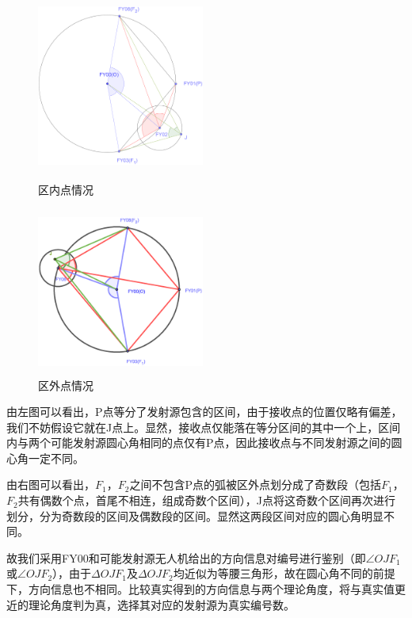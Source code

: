 \documentclass{ctexart}
\begin{document}
\begin{figure}[H]
  \begin{minipage}[t]{0.45\linewidth}
  \centering
  \includegraphics[height=5.5cm,width=5.5cm]{pic/error_circle1(1).eps}
  \caption{区内点情况}
  \label{区内点情况}
  \end{minipage}%
  \begin{minipage}[t]{0.45\linewidth}
  \centering
  \includegraphics[height=5.5cm,width=5.5cm]{pic/error_circle2.eps}
  \caption{区外点情况}
  \label{区外点情况}
  \end{minipage}
  \end{figure}


由左图可以看出，P点等分了发射源包含的区间，由于接收点的位置仅略有偏差，我们不妨假设它就在J点上。显然，接收点仅能落在等分区间的其中一个上，区间内与两个可能发射源圆心角相同的点仅有P点，因此接收点与不同发射源之间的圆心角一定不同。

由右图可以看出，$F_1$，$F_2$之间不包含P点的弧被区外点划分成了奇数段（包括$F_1$，$F_2$共有偶数个点，首尾不相连，组成奇数个区间），J点将这奇数个区间再次进行划分，分为奇数段的区间及偶数段的区间。显然这两段区间对应的圆心角明显不同。

故我们采用FY00和可能发射源无人机给出的方向信息对编号进行鉴别（即$\angle OJF_1$或$\angle OJF_2$），由于$\Delta OJF_1$及$\Delta OJF_2$均近似为等腰三角形，故在圆心角不同的前提下，方向信息也不相同。比较真实得到的方向信息与两个理论角度，将与真实值更近的理论角度判为真，选择其对应的发射源为真实编号数。
\end{document}
